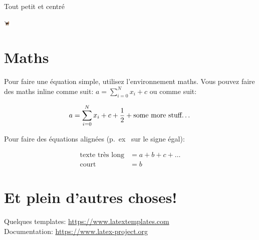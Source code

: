 \documentclass[paper=a4, fontsize=11pt]{article}
\begin{document}
Tout petit et centré

\begin{center}
\includegraphics[width=10pt]{myimage.jpg} %
\end{center}

\section{Maths}

Pour faire une équation simple, utilisez l'environnement maths. Vous pouvez faire des maths inline
comme suit: $a = \sum_{i=0}^{N} x_i + c$ ou comme suit:

\[ a = \sum_{i=0}^{N} x_i + c + \dfrac{1}{2} + \text{some more stuff\dots}\]


Pour faire des équations alignées (p.~ex~ sur le signe égal):

\begin{align}
\text{texte très long} &= a + b + c + \ldots \\
\text{court} &= b
\end{align}


\section{Et plein d'autres choses!}

Quelques templates: \url{https://www.latextemplates.com} \\
Documentation: \url{https://www.latex-project.org}
\end{document}
